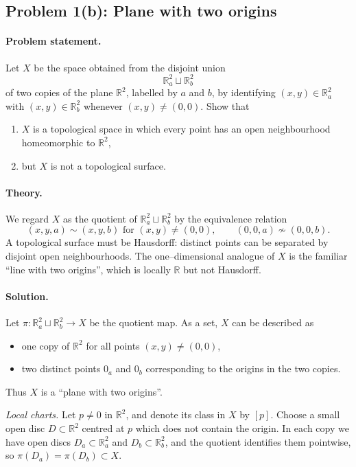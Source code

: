 \documentclass[12pt,a4paper]{article}
\theoremstyle{plain}
\theoremstyle{definition}      %
\begin{document}
\bigskip

\subsection*{Problem 1(b): Plane with two origins}

\paragraph{Problem statement.}
Let $X$ be the space obtained from the disjoint union
\[
\mathbb{R}^2_a \sqcup \mathbb{R}^2_b
\]
of two copies of the plane $\mathbb{R}^2$, labelled by $a$ and $b$, by
identifying $(x,y)\in\mathbb{R}^2_a$ with $(x,y)\in\mathbb{R}^2_b$
whenever $(x,y)\neq (0,0)$.  Show that
\begin{enumerate}
	\item $X$ is a topological space in which every point has an open
	neighbourhood homeomorphic to $\mathbb{R}^2$,
	\item but $X$ is not a topological surface.
\end{enumerate}

\paragraph{Theory.}
We regard $X$ as the quotient of $\mathbb{R}^2_a\sqcup\mathbb{R}^2_b$
by the equivalence relation
\[
(x,y,a)\sim(x,y,b) \text{ for } (x,y)\neq(0,0), \qquad
(0,0,a)\not\sim(0,0,b).
\]
A topological surface must be Hausdorff: distinct points can be separated
by disjoint open neighbourhoods.  The one--dimensional analogue of $X$
is the familiar ``line with two origins'', which is locally $\mathbb{R}$
but not Hausdorff.

\paragraph{Solution.}
Let $\pi:\mathbb{R}^2_a\sqcup\mathbb{R}^2_b\to X$ be the quotient map.
As a set, $X$ can be described as
\begin{itemize}
	\item one copy of $\mathbb{R}^2$ for all points $(x,y)\neq (0,0)$,
	\item two distinct points $0_a$ and $0_b$ corresponding to the origins
	in the two copies.
\end{itemize}
Thus $X$ is a ``plane with two origins''.

\medskip\noindent
\emph{Local charts.}
Let $p\neq 0$ in $\mathbb{R}^2$, and denote its class in $X$ by $[p]$.
Choose a small open disc $D\subset\mathbb{R}^2$ centred at $p$ which
does not contain the origin.  In each copy we have open discs
$D_a\subset\mathbb{R}^2_a$ and $D_b\subset\mathbb{R}^2_b$, and the
quotient identifies them pointwise, so $\pi(D_a)=\pi(D_b)\subset X$.
\end{document}

